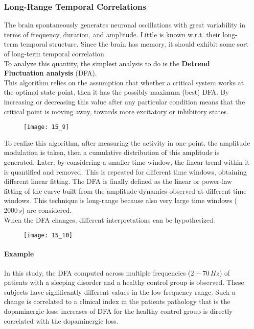 \subsubsection{Long-Range Temporal Correlations}
The brain spontaneously generates neuronal oscillations with great variability in terms of frequency,
duration, and amplitude. Little is known w.r.t. their long-term temporal structure. Since the brain has
memory, it should exhibit some sort of long-term temporal correlation.\\
To analyze this quantity, the simplest analysis to do is the \textbf{Detrend Fluctuation analysis} (DFA).\\
This algorithm relies on the assumption that whether a critical system works at the optimal state point,
then it has the possibly maximum (best) DFA. By increasing or decreasing this value after any particular
condition means that the critical point is moving away, towards more excitatory or inhibitory states.
\begin{figure}[H]
    \centering
    \texttt{[image: 15\_9]}
\end{figure}
To realize this algorithm, after measuring the activity in one point, the amplitude modulation is
taken, then a cumulative distribution of this amplitude is generated. Later, by considering a smaller
time window, the linear trend within it is quantified and removed. This is repeated for different time
windows, obtaining different linear fitting. The DFA is finally defined as the linear or power-law
fitting of the curve built from the amplitude dynamics observed at different time windows. This technique
is long-range because also very large time windows (\(2000\,s\)) are considered.\\
When the DFA changes, different interpretations can be hypothesized.
\begin{figure}[H]
    \centering
    \texttt{[image: 15\_10]}
\end{figure}
\paragraph{Example} In this study, the DFA computed across multiple frequencies (\(2-70\,Hz\)) of
patients with a sleeping disorder and a healthy control group is observed. These subjects have
significantly different values in the low frequency range. Such a change is correlated to a clinical
index in the patients pathology that is the dopaminergic loss: increases of DFA for the healthy control
group is directly correlated with the dopaminergic loss.
